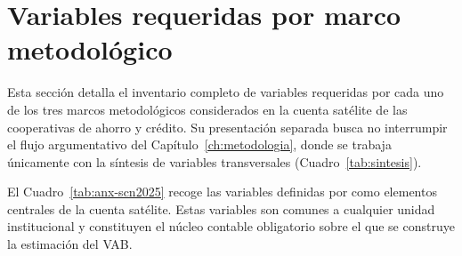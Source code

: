 \section{Variables requeridas por marco metodológico}
\label{anx:variables-marcos}

Esta sección detalla el inventario completo de variables requeridas por cada 
uno de los tres marcos metodológicos considerados en la cuenta satélite de 
las cooperativas de ahorro y crédito. Su presentación separada busca no 
interrumpir el flujo argumentativo del Capítulo~\ref{ch:metodologia}, donde 
se trabaja únicamente con la síntesis de variables transversales 
(Cuadro~\ref{tab:sintesis}).


El Cuadro~\ref{tab:anx-scn2025} recoge las variables definidas por 
 como elementos centrales de la cuenta 
satélite. Estas variables son comunes a cualquier unidad institucional y 
constituyen el núcleo contable obligatorio sobre el que se construye la 
estimación del VAB.

